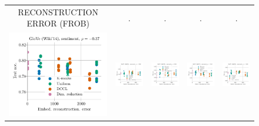 \begin{figure}
\begin{tabular}{@{\hskip -0.0in}c@{\hskip -0.0in}c@{\hskip -0.0in}c@{\hskip -0.0in}c@{\hskip -0.0in}c@{\hskip -0.0in}}
		RECONSTRUCTION ERROR (FROB) & . & . & . & .\\
		\includegraphics[width=.2\linewidth]{figures/glove400k_sentiment_mr_test-acc_vs_embed-frob-error_linx.pdf} &
		\includegraphics[width=.2\linewidth]{figures/glove400k_sentiment_subj_test-acc_vs_embed-frob-error_linx.pdf} &
		\includegraphics[width=.2\linewidth]{figures/glove400k_sentiment_cr_test-acc_vs_embed-frob-error_linx.pdf} &
		\includegraphics[width=.2\linewidth]{figures/glove400k_sentiment_sst_test-acc_vs_embed-frob-error_linx.pdf} &
		\includegraphics[width=.2\linewidth]{figures/glove400k_sentiment_mpqa_test-acc_vs_embed-frob-error_linx.pdf} \\
		
		

\end{tabular}
\end{figure}
